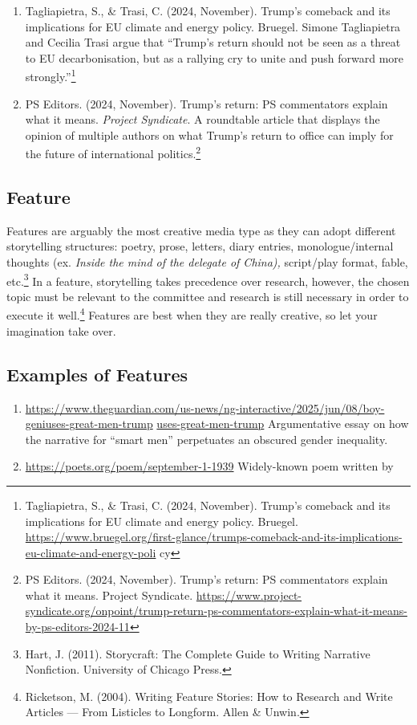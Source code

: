 \begin{enumerate}
  \item Tagliapietra, S., \& Trasi, C. (2024, November). Trump's comeback and its implications for EU climate and energy policy. Bruegel. Simone Tagliapietra and Cecilia Trasi argue that “Trump’s return should not be seen as a threat to EU decarbonisation, but as a rallying cry to unite and push forward more strongly.”\footnote{Tagliapietra, S., \& Trasi, C. (2024, November). Trump's comeback and its implications for EU climate and energy policy. Bruegel. \url{https://www.bruegel.org/first-glance/trumps-comeback-and-its-implications-eu-climate-and-energy-poli} cy}
  \item PS Editors. (2024, November). Trump's return: PS commentators explain what it means. \emph{Project Syndicate}. A roundtable article that displays the opinion of multiple authors on what Trump's return to office can imply for the future of international politics.\footnote{PS Editors. (2024, November). Trump's return: PS commentators explain what it means. Project Syndicate. \url{https://www.project-syndicate.org/onpoint/trump-return-ps-commentators-explain-what-it-means-by-ps-editors-2024-11}}
\end{enumerate}

\subsection{Feature}

Features are arguably the most creative media type as they can adopt different storytelling structures: poetry, prose, letters, diary entries, monologue/internal thoughts (ex. \emph{Inside the mind of the delegate of China),} script/play format, fable, etc.\footnote{Hart, J. (2011). Storycraft: The Complete Guide to Writing Narrative Nonfiction. University of Chicago Press.} In a feature, storytelling takes precedence over research, however, the chosen topic must be relevant to the committee and research is still necessary in order to execute it well.\footnote{Ricketson, M. (2004). Writing Feature Stories: How to Research and Write Articles — From Listicles to Longform. Allen \& Unwin.} Features are best when they are really creative, so let your imagination take over.

\subsection{Examples of Features}

\begin{enumerate}
  \item \url{https://www.theguardian.com/us-news/ng-interactive/2025/jun/08/boy-geniuses-great-men-trump} \href{https://www.theguardian.com/us-news/ng-interactive/2025/jun/08/boy-geniuses-great-men-trump}{uses-great-men-trump} Argumentative essay on how the narrative for “smart men” perpetuates an obscured gender inequality.
  \item \url{https://poets.org/poem/september-1-1939} Widely-known poem written by
\end{enumerate}

